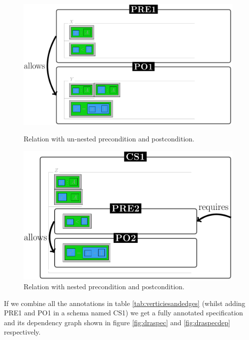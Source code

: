 \begin{figure}[H]
\centering
\begin{minipage}{0.45\textwidth}
\centering
\includegraphics[scale=0.18]{Figures/Formalising/unnested.png}
\caption{Relation with un-nested precondition and postcondition.  \label{fig:unnested}}
\end{minipage}\hfill
\begin{minipage}{0.45\textwidth}
\centering
\includegraphics[scale=0.18]{Figures/Formalising/nested.png}
\caption{Relation with nested precondition and postcondition.  \label{fig:nested}}
\end{minipage}
\end{figure}

If we combine all the annotations in table \ref{tab:verticiesandedges} (whilst
adding PRE1 and PO1 in a schema named CS1) we get a fully annotated
specification and its dependency graph shown in figure \ref{fig:draspec} and
\ref{fig:draspecdep} respectively.

